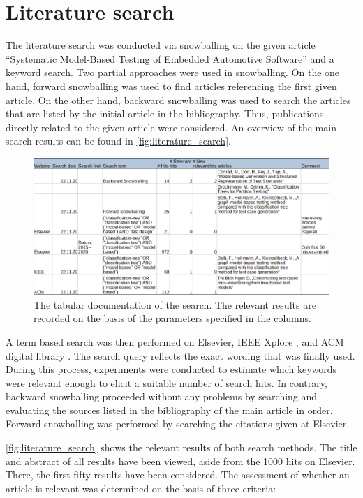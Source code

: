 \section{Literature search}

The literature search was conducted via snowballing on the given article \enquote{Systematic Model-Based Testing of Embedded Automotive Software} and a keyword search. Two partial approaches were used in snowballing. On the one hand, forward snowballing was used to find articles referencing the first given article. On the other hand, backward snowballing was used to search the articles that are listed by the initial article in the bibliography. Thus, publications directly related to the given article were considered. An overview of the main search results can be found in \autoref{fig:literature_search}. 

\begin{figure}[H]
\centering
\includegraphics[scale=0.32]{../images/Suchdokumentation_v2.png} 
\caption{The tabular documentation of the search. The relevant results are recorded on the basis of the parameters specified in the columns.}
\label{fig:literature_search}
\end{figure}

A term based search was then performed on Elsevier, IEEE Xplore \cite{ieee}, and ACM digital library \cite{acm}. The search query reflects the exact wording that was finally used. During this process, experiments were conducted to estimate which keywords were relevant enough to elicit a suitable number of search hits. In contrary, backward snowballing proceeded without any problems by searching and evaluating the sources listed in the bibliography of the main article in order. Forward snowballing was performed by searching the citations given at Elsevier.

\autoref{fig:literature_search} shows the relevant results of both search methods. The title and abstract of all results have been viewed, aside from the 1000 hits on Elsevier. There, the first fifty results have been considered. The assessment of whether an article is relevant was determined on the basis of three criteria:

